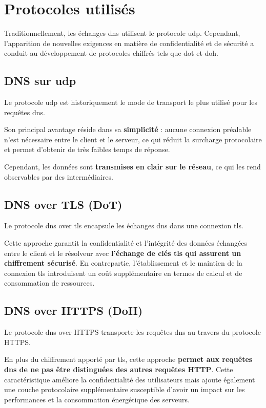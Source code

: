 \documentclass[12pt, a4paper]{report}
\begin{document}
	\section{Protocoles utilisés}

	Traditionnellement, les échanges \gls{dns} utilisent le protocole \gls{udp}. Cependant, l'apparition de nouvelles exigences en matière de confidentialité et de sécurité a conduit au développement de protocoles chiffrés tels que \gls{dot} et \gls{doh}.

	\subsection{DNS sur \gls{udp}}

	Le protocole \gls{udp} est historiquement le mode de transport le plus utilisé pour les requêtes \gls{dns}.

	Son principal avantage réside dans sa \textbf{simplicité} : aucune connexion préalable n'est nécessaire entre le client et le serveur, ce qui réduit la surcharge protocolaire et permet d'obtenir de très faibles temps de réponse.

	Cependant, les données sont \textbf{transmises en clair sur le réseau}, ce qui les rend observables par des intermédiaires.

	\subsection{DNS over TLS (DoT)}

	Le protocole \gls{dns} over \gls{tls} encapsule les échanges \gls{dns} dans une connexion \gls{tls}.

	Cette approche garantit la confidentialité et l'intégrité des données échangées entre le client et le résolveur avec \textbf{l'échange de clés \gls{tls} qui assurent un chiffrement sécurisé}. En contrepartie, l'établissement et le maintien de la connexion \gls{tls} introduisent un coût supplémentaire en termes de calcul et de consommation de ressources.

	\subsection{DNS over HTTPS (DoH)}

	Le protocole \gls{dns} over HTTPS transporte les requêtes \gls{dns} au travers du protocole HTTPS.

	En plus du chiffrement apporté par \gls{tls}, cette approche \textbf{permet aux requêtes \gls{dns} de ne pas être distinguées des autres requêtes HTTP}. Cette caractéristique améliore la confidentialité des utilisateurs mais ajoute également une couche protocolaire supplémentaire susceptible d'avoir un impact sur les performances et la consommation énergétique des serveurs.
\end{document}
